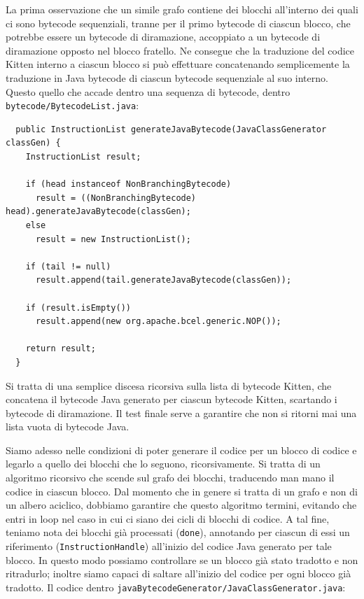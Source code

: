La prima osservazione \e che un simile grafo contiene dei blocchi all'interno dei quali
ci sono bytecode sequenziali, tranne per il primo bytecode di ciascun blocco, che
potrebbe essere un bytecode di diramazione, accoppiato a un bytecode di diramazione
opposto nel blocco fratello. Ne consegue che la traduzione del codice Kitten interno
a ciascun blocco si pu\`o effettuare concatenando semplicemente la traduzione
in Java bytecode di ciascun bytecode sequenziale al suo interno. Questo \e quello
che accade dentro una sequenza di bytecode, \cioe dentro \texttt{bytecode/BytecodeList.java}:

{\small\begin{verbatim}
  public InstructionList generateJavaBytecode(JavaClassGenerator classGen) {
    InstructionList result;

    if (head instanceof NonBranchingBytecode)
      result = ((NonBranchingBytecode) head).generateJavaBytecode(classGen);
    else
      result = new InstructionList();

    if (tail != null)
      result.append(tail.generateJavaBytecode(classGen));

    if (result.isEmpty())
      result.append(new org.apache.bcel.generic.NOP());

    return result;
  }
\end{verbatim}}

\noindent
Si tratta di una semplice discesa ricorsiva sulla lista di bytecode Kitten,
che concatena il bytecode Java generato per ciascun bytecode Kitten, scartando i
bytecode di diramazione. Il test finale serve a garantire che non si ritorni mai
una lista vuota di bytecode Java.

Siamo adesso nelle condizioni di poter generare il codice per un blocco di codice
e legarlo a quello dei blocchi che lo seguono, ricorsivamente. Si tratta di un
algoritmo ricorsivo che scende sul grafo dei blocchi, traducendo man mano
il codice in ciascun blocco. Dal momento che in genere si tratta di un grafo
e non di un albero aciclico, dobbiamo garantire che questo algoritmo termini,
evitando \cioe che entri in loop nel caso in cui ci siano dei cicli di blocchi di
codice. A tal fine, teniamo nota dei blocchi gi\`a processati (\texttt{done}),
annotando per ciascun di essi un riferimento
(\texttt{InstructionHandle}) all'inizio del codice Java generato per tale blocco.
In questo modo possiamo controllare se un blocco \e gi\`a stato tradotto e non
ritradurlo; inoltre siamo capaci di saltare all'inizio del codice per ogni
blocco gi\`a tradotto. Il codice \e dentro
\texttt{javaBytecodeGenerator/JavaClassGenerator.java}:

